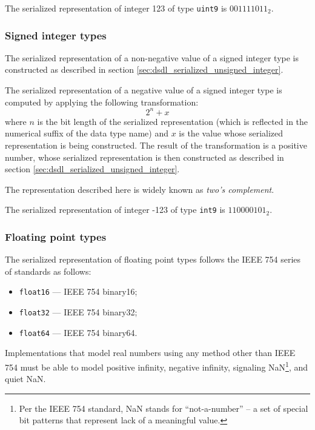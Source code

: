 \begin{remark}
    The serialized representation of integer 123 of type \verb|uint9| is $001111011_2$.
\end{remark}

\subsubsection{Signed integer types}

The serialized representation of a non-negative value of a signed integer type is constructed as described
in section \ref{sec:dsdl_serialized_unsigned_integer}.

The serialized representation of a negative value of a signed integer type is computed by
applying the following transformation:
$$2^n + x$$
where $n$ is the bit length of the serialized representation
(which is reflected in the numerical suffix of the data type name)
and $x$ is the value whose serialized representation is being constructed.
The result of the transformation is a positive number,
whose serialized representation is then constructed as described in section \ref{sec:dsdl_serialized_unsigned_integer}.

The representation described here is widely known as \emph{two's complement}.

\begin{remark}
    The serialized representation of integer -123 of type \verb|int9| is $110000101_2$.
\end{remark}

\subsubsection{Floating point types}

The serialized representation of floating point types follows the IEEE 754 series of standards as follows:

\begin{itemize}
    \item \verb|float16| --- IEEE 754 binary16;
    \item \verb|float32| --- IEEE 754 binary32;
    \item \verb|float64| --- IEEE 754 binary64.
\end{itemize}

Implementations that model real numbers using any method other than IEEE 754 must be able to model
positive infinity, negative infinity, signaling NaN\footnote{Per the IEEE 754 standard, NaN stands for
``not-a-number'' -- a set of special bit patterns that represent lack of a meaningful value.},
and quiet NaN.

